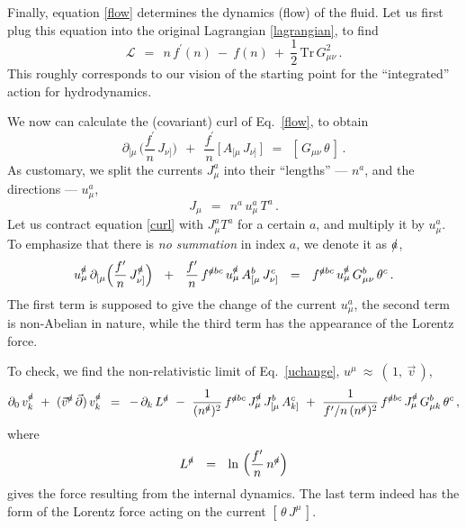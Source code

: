 \documentclass[epsfig,12pt]{article}
\def\beq{\begin{equation}}
\def\eeq{\end{equation}}
\newcommand{\p}{\partial}
\newcommand{\ml}{\mathcal{L}}
\newcommand{\Tr}{\text{Tr}}
\begin{document}
	Finally, equation \eqref{flow} determines the dynamics (flow) of the fluid.
	Let us first plug this equation into the original Lagrangian \eqref{lagrangian}, to find
\beq
\label{Lf}
	\ml    ~~=~~    n\, f^\prime(n)  ~-~  f(n)  ~+~ \frac{1}{2}\, \Tr\, G_{\mu\nu}^2\,.
\eeq
	This roughly corresponds to our vision of the starting point for the ``integrated'' action for
	hydrodynamics.



	We now can calculate the (covariant) curl of Eq.~\eqref{flow}, to obtain
\beq
\label{curl}
	\partial_{[\mu}\, \Big( \frac{f^\prime}{n}\, J_{\nu]} \Big)  ~~+~~
	\frac{f^\prime}{n}\, \big[\, A_{[\mu}\, J_{\nu]} \,\big]    ~~=~~
	[\, G_{\mu\nu}\, \theta \,]\,.
\eeq
	As customary, we split the currents $ J_\mu^a $ into their ``lengths'' --- $ n^a $,
	and the directions --- $ u_\mu^a $,
\beq
	J_\mu    ~~=~~    n^a\, u_{\mu}^a\, T^a\,.
\eeq
	Let us contract equation \eqref{curl} with $ J_\mu^a T^a $ for a certain $ a $,
	and multiply it by $ u_\mu^a $.
	To emphasize that there is \emph{no summation} in index $ a $, we denote it as $ \slashed{a} $,
\beq
\label{uchange}
	u_\mu^\slashed a\, \p_{[\mu} \Big( \frac{f^\prime}{n}\, J_{\nu]}^\slashed a \Big)  ~~+~~
	\frac{f^\prime}{n}\, f^{\slashed a b c}\, u_\mu^\slashed a\, A_{[\mu}^b\, J_{\nu]}^c    ~~=~~
	f^{\slashed a b c}\, u_\mu^\slashed a\, G_{\mu\nu}^b\, \theta^c\,.
\eeq
	The first term is supposed to give the change of the current $ u_\mu^a $,
	the second term is non-Abelian in nature, while the third term has the appearance of the Lorentz force.

	To check, we find the non-relativistic limit of Eq.~\eqref{uchange}, $ u^\mu ~\approx~ (\,1,~ \vec{v}\,) $,
\beq
	\p_0\, v_k^\slashed a  ~+~  (\vec{v}{}^\slashed{a}\, \vec{\p})\, v_k^\slashed a    \,~=~\,
	-\, \p_k\, L^\slashed{a}  ~-~  \frac{1}{(n^\slashed{a})^2}\, f^{\slashed a b c}\, J_\mu^\slashed{a}\, J_{[\mu}^b\, A_{k]}^c  ~+~
	\frac{1}{f^\prime / n\, (n^{\slashed a})^2}\, f^{\slashed a b c}\, J_\mu^\slashed{a}\, G_{\mu k}^b\, \theta^c\,,
\eeq
	where
\beq
	L^\slashed{a}    ~~=~~    \ln\, \Big( \frac{f^\prime}{n}\, n^\slashed{a} \Big)
\eeq
	gives the force resulting from the internal dynamics.
	The last term indeed has the form of the Lorentz force acting on the current $ [\, \theta\, J^\mu \,] $.
\end{document}
